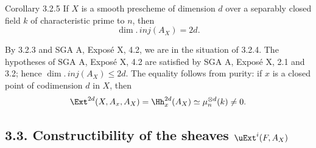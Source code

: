 \begin{statement}{Corollary 3.2.5}
If $X$ is a smooth prescheme of dimension $d$ over a separably closed field $k$ of characteristic prime to $n$, then
\[
   \dim.\,inj(A_X)=2d.
\]
\end{statement}

\begin{prooftext}
By 3.2.3 and SGA A, Exposé X, 4.2, we are in the situation of 3.2.4. The hypotheses of SGA A, Exposé X, 4.2 are satisfied by SGA A, Exposé X, 2.1 and 3.2; hence $\dim.\,inj(A_X)\le2d$. The equality follows from purity: if $x$ is a closed point of codimension $d$ in $X$, then
\[
   \Ext^{2d}(X,A_x,A_X)=\Hh^{2d}_x(A_X)
      \simeq\mu_n^{\otimes d}(k)\ne0.
\]
\qedtext
\end{prooftext}

\subsection*{3.3. Constructibility of the sheaves $\uExt^i(F,A_X)$}

